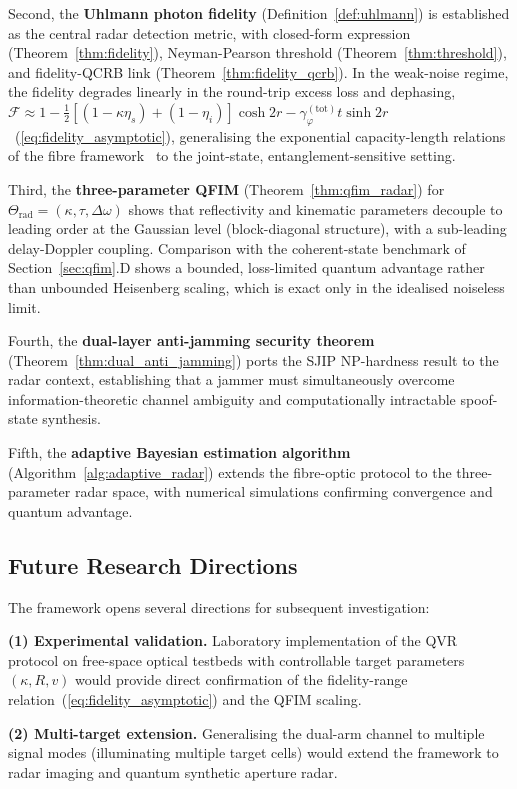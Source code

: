 \documentclass[journal]{IEEEtran}
\begin{document}
Second, the \textbf{Uhlmann photon fidelity} (Definition~\ref{def:uhlmann}) is established as the central radar detection metric, with closed-form expression (Theorem~\ref{thm:fidelity}), Neyman-Pearson threshold (Theorem~\ref{thm:threshold}), and fidelity-QCRB link (Theorem~\ref{thm:fidelity_qcrb}). In the weak-noise regime, the fidelity degrades linearly in the round-trip excess loss and dephasing, $\mathcal{F}\approx1-\tfrac12[(1-\kappa\eta_s)+(1-\eta_i)]\cosh2r-\gamma_\varphi^{(\text{tot})}t\sinh2r$~(\ref{eq:fidelity_asymptotic}), generalising the exponential capacity-length relations of the fibre framework~\cite{gautum2024rigorous} to the joint-state, entanglement-sensitive setting.

Third, the \textbf{three-parameter QFIM} (Theorem~\ref{thm:qfim_radar}) for $\Theta_{\text{rad}} = (\kappa, \tau, \Delta\omega)$ shows that reflectivity and kinematic parameters decouple to leading order at the Gaussian level (block-diagonal structure), with a sub-leading delay-Doppler coupling. Comparison with the coherent-state benchmark of Section~\ref{sec:qfim}.D shows a bounded, loss-limited quantum advantage rather than unbounded Heisenberg scaling, which is exact only in the idealised noiseless limit.

Fourth, the \textbf{dual-layer anti-jamming security theorem} (Theorem~\ref{thm:dual_anti_jamming}) ports the SJIP NP-hardness result to the radar context, establishing that a jammer must simultaneously overcome information-theoretic channel ambiguity and computationally intractable spoof-state synthesis.

Fifth, the \textbf{adaptive Bayesian estimation algorithm} (Algorithm~\ref{alg:adaptive_radar}) extends the fibre-optic protocol to the three-parameter radar space, with numerical simulations confirming convergence and quantum advantage.

\subsection{Future Research Directions}

The framework opens several directions for subsequent investigation:

\textbf{(1) Experimental validation.} Laboratory implementation of the QVR protocol on free-space optical testbeds with controllable target parameters $(\kappa, R, v)$ would provide direct confirmation of the fidelity-range relation~(\ref{eq:fidelity_asymptotic}) and the QFIM scaling.

\textbf{(2) Multi-target extension.} Generalising the dual-arm channel to multiple signal modes (illuminating multiple target cells) would extend the framework to radar imaging and quantum synthetic aperture radar.
\end{document}
